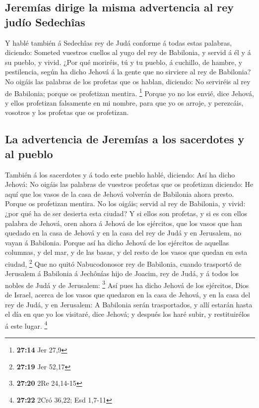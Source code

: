 \hypertarget{jeremuxedas-dirige-la-misma-advertencia-al-rey-juduxedo-sedechuxeeas}{%
\subsection{Jeremías dirige la misma advertencia al rey judío
Sedechîas}\label{jeremuxedas-dirige-la-misma-advertencia-al-rey-juduxedo-sedechuxeeas}}

 Y hablé también á Sedechîas rey de Judá conforme á todas
estas palabras, diciendo: Someted vuestros cuellos al yugo del rey de
Babilonia, y servid á él y á su pueblo, y vivid.  ¿Por qué
moriréis, tú y tu pueblo, á cuchillo, de hambre, y pestilencia, según ha
dicho Jehová á la gente que no sirviere al rey de Babilonia?
 No oigáis las palabras de los profetas que os hablan,
diciendo: No serviréis al rey de Babilonia; porque os profetizan
mentira. \footnote{\textbf{27:14} Jer 27,9}  Porque yo no
los envié, dice Jehová, y ellos profetizan falsamente en mi nombre, para
que yo os arroje, y perezcáis, vosotros y los profetas que os
profetizan.

\hypertarget{la-advertencia-de-jeremuxedas-a-los-sacerdotes-y-al-pueblo}{%
\subsection{La advertencia de Jeremías a los sacerdotes y al
pueblo}\label{la-advertencia-de-jeremuxedas-a-los-sacerdotes-y-al-pueblo}}

 También á los sacerdotes y á todo este pueblo hablé,
diciendo: Así ha dicho Jehová: No oigáis las palabras de vuestros
profetas que os profetizan diciendo: He aquí que los vasos de la casa de
Jehová volverán de Babilonia ahora presto. Porque os profetizan mentira.
 No los oigáis; servid al rey de Babilonia, y vivid: ¿por
qué ha de ser desierta esta ciudad?  Y si ellos son
profetas, y si es con ellos palabra de Jehová, oren ahora á Jehová de
los ejércitos, que los vasos que han quedado en la casa de Jehová y en
la casa del rey de Judá y en Jerusalem, no vayan á Babilonia.
 Porque así ha dicho Jehová de los ejércitos de aquellas
columnas, y del mar, y de las basas, y del resto de los vasos que quedan
en esta ciudad, \footnote{\textbf{27:19} Jer 52,17}  Que no
quitó Nabucodonosor rey de Babilonia, cuando trasportó de Jerusalem á
Babilonia á Jechônías hijo de Joacim, rey de Judá, y á todos los nobles
de Judá y de Jerusalem: \footnote{\textbf{27:20} 2Re 24,14-15}
 Así pues ha dicho Jehová de los ejércitos, Dios de Israel,
acerca de los vasos que quedaron en la casa de Jehová, y en la casa del
rey de Judá, y en Jerusalem:  A Babilonia serán
trasportados, y allí estarán hasta el día en que yo los visitaré, dice
Jehová; y después los haré subir, y restituirélos á este lugar.
\footnote{\textbf{27:22} 2Cró 36,22; Esd 1,7-11}

